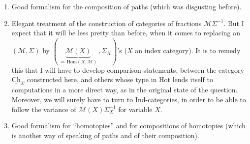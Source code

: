 \documentclass[11pt]{article}
\newcommand{\Ch}{\underline{\mathrm{Ch}}}
\newcommand{\uHom}{\underline{\mathrm{Hom}}}
\begin{document}
\begin{enumerate}
\item[a)] Good formalism for the composition of paths (which was disgusting before).

\item[b)] Elegant treatment of the construction of categories of fractions $\mathcal{M}\Sigma^{-1}$. But I expect that it will be less pretty than before, when it comes to replacing an $(\mathcal{M},\Sigma)$ by $(\ \underbrace{\mathcal{M}(X)}_{=\,\uHom(X,\mathcal{M})}\ ,\Sigma_X)$'s ($X$ an index category). It is to remedy this that I will have to develop comparison statements, between the category $\Ch_{\Sigma}$ constructed here, and others whose type in Hot lends itself to computations in a more direct way, as in the original state of the question. Moreover, we will surely have to turn to Ind-categories, in order to be able to follow the variance of $\mathcal{M}(X)\Sigma_X^{-1}$ for variable $X$.

\item[c)] Good formalism for ``homotopies'' and for compositions of homotopies (which is another way of speaking of paths and of their composition).
\end{enumerate}
\end{document}
